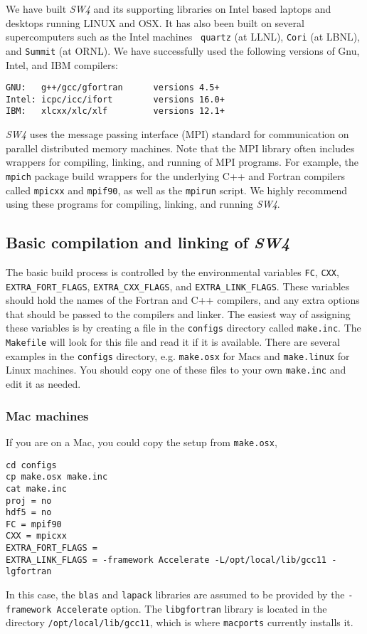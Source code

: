 \documentclass[11pt]{article}
\begin{document}
We have built \emph{SW4} and its supporting libraries on Intel based laptops and desktops running
LINUX and OSX. It has also been built on several supercomputers such as the Intel machines {\tt 
quartz} (at LLNL), {\tt Cori} (at LBNL), and {\tt Summit} (at ORNL). We have
successfully used the following versions of Gnu, Intel, and IBM compilers:
\begin{verbatim}
GNU:   g++/gcc/gfortran      versions 4.5+
Intel: icpc/icc/ifort        versions 16.0+
IBM:   xlcxx/xlc/xlf         versions 12.1+
\end{verbatim}

\emph{SW4} uses the message passing interface (MPI) standard for communication on parallel distributed memory machines. Note that the MPI library often includes wrappers for compiling, linking, and running of MPI programs. For example, the {\tt mpich} package build wrappers for the underlying C++ and Fortran compilers called {\tt mpicxx} and {\tt mpif90}, as well as the {\tt mpirun} script. We highly recommend using these programs for compiling, linking, and running \emph{SW4}.


\subsection{Basic compilation and linking of \emph{SW4}}\label{sec:basic-install}

The basic build process is controlled by the environmental variables \verb+FC+, \verb+CXX+, \verb+EXTRA_FORT_FLAGS+, \verb+EXTRA_CXX_FLAGS+, and \verb+EXTRA_LINK_FLAGS+. These variables should hold the names of the Fortran and C++ compilers, and any extra options that should be passed to the compilers and linker. The easiest way of assigning these variables is by creating a file in the \verb+configs+ directory called \verb+make.inc+. The \verb+Makefile+ will look for this file and read it if it is available. There are several examples in the \verb+configs+ directory, e.g. \verb+make.osx+ for Macs and \verb+make.linux+ for Linux machines. You should copy one of these files to your own \verb+make.inc+ and edit it as needed. 

\subsubsection{Mac machines}
If you are on a Mac, you could copy the setup from \verb+make.osx+,
\begin{verbatim}
cd configs
cp make.osx make.inc
cat make.inc
proj = no
hdf5 = no
FC = mpif90
CXX = mpicxx
EXTRA_FORT_FLAGS = 
EXTRA_LINK_FLAGS = -framework Accelerate -L/opt/local/lib/gcc11 -lgfortran
\end{verbatim}
In this case, the \verb+blas+ and \verb+lapack+ libraries are assumed to be provided by the \verb+-framework Accelerate+ option. The \verb+libgfortran+ library is located in the directory \verb+/opt/local/lib/gcc11+, which is where \verb+macports+ currently installs it.
\end{document}
